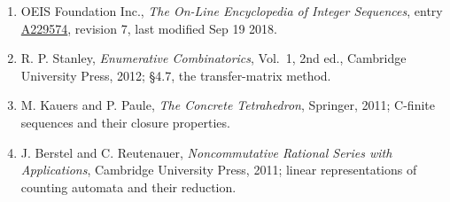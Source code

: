 \documentclass[11pt]{article}
\theoremstyle{definition}
\begin{document}
\begin{enumerate}

\item OEIS Foundation Inc., \emph{The On-Line Encyclopedia of Integer Sequences}, entry \href{https://oeis.org/A229574}{A229574}, revision 7, last modified Sep 19 2018.

\item R. P. Stanley, \emph{Enumerative Combinatorics}, Vol.~1, 2nd ed., Cambridge University Press, 2012; \S4.7, the transfer-matrix method.

\item M. Kauers and P. Paule, \emph{The Concrete Tetrahedron}, Springer, 2011; C-finite sequences and their closure properties.

\item J. Berstel and C. Reutenauer, \emph{Noncommutative Rational Series with Applications}, Cambridge University Press, 2011; linear representations of counting automata and their reduction.

\end{enumerate}
\end{document}
